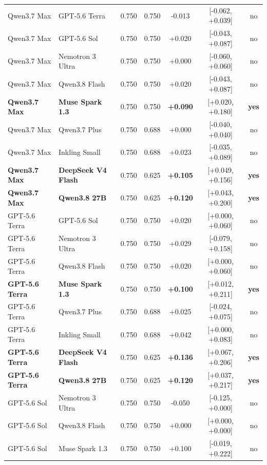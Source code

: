 \begin{longtable}{llrrccc}
Qwen3.7 Max & GPT-5.6 Terra & 0.750 & 0.750 & -0.013 & [-0.062, +0.039] & no \\
Qwen3.7 Max & GPT-5.6 Sol & 0.750 & 0.750 & +0.020 & [-0.043, +0.087] & no \\
Qwen3.7 Max & Nemotron 3 Ultra & 0.750 & 0.750 & +0.000 & [-0.060, +0.060] & no \\
Qwen3.7 Max & Qwen3.8 Flash & 0.750 & 0.750 & +0.020 & [-0.043, +0.087] & no \\
\textbf{Qwen3.7 Max} & \textbf{Muse Spark 1.3} & 0.750 & 0.750 & \textbf{+0.090} & [+0.020, +0.180] & \textbf{yes} \\
Qwen3.7 Max & Qwen3.7 Plus & 0.750 & 0.688 & +0.000 & [-0.040, +0.040] & no \\
Qwen3.7 Max & Inkling Small & 0.750 & 0.688 & +0.023 & [-0.035, +0.089] & no \\
\textbf{Qwen3.7 Max} & \textbf{DeepSeek V4 Flash} & 0.750 & 0.625 & \textbf{+0.105} & [+0.049, +0.156] & \textbf{yes} \\
\textbf{Qwen3.7 Max} & \textbf{Qwen3.8 27B} & 0.750 & 0.625 & \textbf{+0.120} & [+0.043, +0.200] & \textbf{yes} \\
GPT-5.6 Terra & GPT-5.6 Sol & 0.750 & 0.750 & +0.020 & [+0.000, +0.060] & no \\
GPT-5.6 Terra & Nemotron 3 Ultra & 0.750 & 0.750 & +0.029 & [-0.079, +0.158] & no \\
GPT-5.6 Terra & Qwen3.8 Flash & 0.750 & 0.750 & +0.020 & [+0.000, +0.060] & no \\
\textbf{GPT-5.6 Terra} & \textbf{Muse Spark 1.3} & 0.750 & 0.750 & \textbf{+0.100} & [+0.012, +0.211] & \textbf{yes} \\
GPT-5.6 Terra & Qwen3.7 Plus & 0.750 & 0.688 & +0.025 & [-0.024, +0.075] & no \\
GPT-5.6 Terra & Inkling Small & 0.750 & 0.688 & +0.042 & [+0.000, +0.083] & no \\
\textbf{GPT-5.6 Terra} & \textbf{DeepSeek V4 Flash} & 0.750 & 0.625 & \textbf{+0.136} & [+0.067, +0.206] & \textbf{yes} \\
\textbf{GPT-5.6 Terra} & \textbf{Qwen3.8 27B} & 0.750 & 0.625 & \textbf{+0.120} & [+0.037, +0.217] & \textbf{yes} \\
GPT-5.6 Sol & Nemotron 3 Ultra & 0.750 & 0.750 & -0.050 & [-0.125, +0.000] & no \\
GPT-5.6 Sol & Qwen3.8 Flash & 0.750 & 0.750 & +0.000 & [+0.000, +0.000] & no \\
GPT-5.6 Sol & Muse Spark 1.3 & 0.750 & 0.750 & +0.100 & [-0.019, +0.222] & no \\

\end{longtable}
